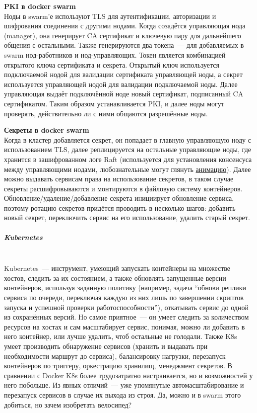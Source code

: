     \textbf{PKI в docker swarm} ~\\
    Ноды в swarm'е используют TLS для аутентификации, авторизации и шифрования соединения с другими нодами. Когда созадётся управляющая нода (manager), она генерирует CA сертификат и ключевую пару для
    дальнейшего общения с остальными. Также генерируются два токена~--- для добавляемых в swarm нод-работников и нод-управляющих. Токен является комбинацией открытого ключа сертификата и секрета. Открытый ключ используется подключаемой нодой для валидации сертификата управляющей ноды, а секрет
    используется управляющей нодой для валидации подключаемой ноды. Далее управляющая выдаёт подключённой ноде новый сертификат, подписанный CA сертификатом. Таким образом устанавливается PKI, и далее ноды могут проверять, действительно ли с ними общаются разрешённые ноды. \autocite{DockerSwarmPKI}

    \textbf{Секреты в docker swarm} ~\\
    Когда в кластер добавляется секрет, он попадает в главную управляющую ноду с использованием TLS, далее реплицируется на остальные управляющие ноды, где хранится в зашифрованном логе Raft (используется для установления консенсуса между управляющими нодами, любознательные могут
    глянуть \href{http://thesecretlivesofdata.com/raft/}{анимацию}). Далее можно выдавать сервисам права на использование секретов, в таком случае секреты расшифровываются и монтируются в файловую систему контейнеров. Обновление/удаление/добавление секрета инициирует обновление сервиса,
    поэтому ротацию секретов придётся проводить в несколько шагов: добавить новый секрет, переключить сервис на его использование, удалить старый секрет. \autocite{DockerSwarmSecrets}

\subparagraph{Kubernetes} ~\\
    Kubernetes~--- инструмент, умеющий запускать контейнеры на множестве хостов, следить за их состоянием, а также обновлять запущенные версии контейнеров, используя заданную политику (например, задача ``обнови реплики сервиса по очереди, переключая каждую из них лишь по завершении
    скриптов запуска и успешной проверки работоспособности''), откатывать сервис до одной из сохранённых версий. Но самое приятное~--- он умеет следить за количеством ресурсов на хостах и сам масштабирует сервис, понимая, можно ли добавить в него контейнер, или лучше удалить,
    чтоб остальные не голодали. Также K8s умеет производить обнаружение сервисов (хранить и выдавать при необходимости маршрут до сервиса), балансировку нагрузки, перезапуск контейнеров по триггеру, оркестрацию хранилищ, менеджмент секретов. В сравнении с Docker K8s более трудозатратно настраивается, но и возможностей у него побольше.
    Из явных отличий~--- уже упомянутые автомасштабирование и перезапуск сервисов в случае их выхода из строя. Да, можно и в swarm этого добиться, но зачем изобретать велосипед?

